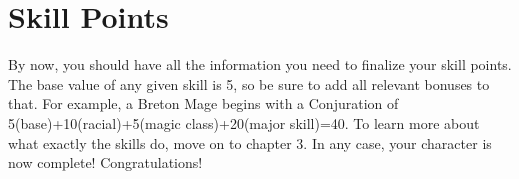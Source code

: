 \section{Skill Points}
By now, you should have all the information you need to finalize your skill points. The base value of any given skill is 5, so be sure to add all relevant bonuses to that. For example, a Breton Mage begins with a Conjuration of 5(base)+10(racial)+5(magic class)+20(major skill)=40. To learn more about what exactly the skills do, move on to chapter 3. In any case, your character is now complete! Congratulations!
